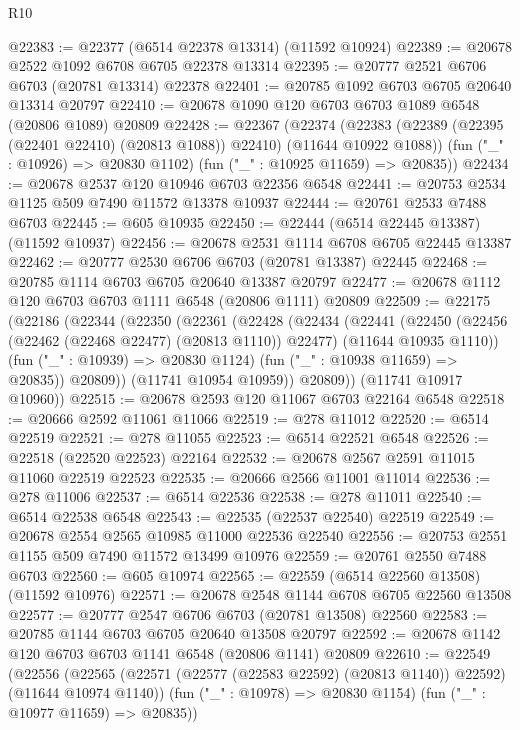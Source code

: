 \begin{lexlean}{R10}
\begin{coremodule}
@22383 := @22377 (@6514 @22378 @13314) (@11592 @10924)
@22389 := @20678 @2522 @1092 @6708 @6705 @22378 @13314
@22395 := @20777 @2521 @6706 @6703 (@20781 @13314) @22378
@22401 := @20785 @1092 @6703 @6705 @20640 @13314 @20797
@22410 := @20678 @1090 @120 @6703 @6703 @1089 @6548 (@20806 @1089) @20809
@22428 := @22367
    (@22374
      (@22383 (@22389 (@22395 (@22401 @22410) (@20813 @1088)) @22410) (@11644 @10922 @1088))
      (fun ("_" : @10926) => @20830 @1102)
      (fun ("_" : @10925 @11659) => @20835))
@22434 := @20678 @2537 @120 @10946 @6703 @22356 @6548
@22441 := @20753 @2534 @1125 @509 @7490 @11572 @13378 @10937
@22444 := @20761 @2533 @7488 @6703
@22445 := @605 @10935
@22450 := @22444 (@6514 @22445 @13387) (@11592 @10937)
@22456 := @20678 @2531 @1114 @6708 @6705 @22445 @13387
@22462 := @20777 @2530 @6706 @6703 (@20781 @13387) @22445
@22468 := @20785 @1114 @6703 @6705 @20640 @13387 @20797
@22477 := @20678 @1112 @120 @6703 @6703 @1111 @6548 (@20806 @1111) @20809
@22509 := @22175
    (@22186
      (@22344
        (@22350
          (@22361
            (@22428
              (@22434
                (@22441
                  (@22450
                    (@22456 (@22462 (@22468 @22477) (@20813 @1110)) @22477)
                    (@11644 @10935 @1110))
                  (fun ("_" : @10939) => @20830 @1124)
                  (fun ("_" : @10938 @11659) => @20835))
                @20809))
            (@11741 @10954 @10959))
          @20809))
      (@11741 @10917 @10960))
@22515 := @20678 @2593 @120 @11067 @6703 @22164 @6548
@22518 := @20666 @2592 @11061 @11066
@22519 := @278 @11012
@22520 := @6514 @22519
@22521 := @278 @11055
@22523 := @6514 @22521 @6548
@22526 := @22518 (@22520 @22523) @22164
@22532 := @20678 @2567 @2591 @11015 @11060 @22519 @22523
@22535 := @20666 @2566 @11001 @11014
@22536 := @278 @11006
@22537 := @6514 @22536
@22538 := @278 @11011
@22540 := @6514 @22538 @6548
@22543 := @22535 (@22537 @22540) @22519
@22549 := @20678 @2554 @2565 @10985 @11000 @22536 @22540
@22556 := @20753 @2551 @1155 @509 @7490 @11572 @13499 @10976
@22559 := @20761 @2550 @7488 @6703
@22560 := @605 @10974
@22565 := @22559 (@6514 @22560 @13508) (@11592 @10976)
@22571 := @20678 @2548 @1144 @6708 @6705 @22560 @13508
@22577 := @20777 @2547 @6706 @6703 (@20781 @13508) @22560
@22583 := @20785 @1144 @6703 @6705 @20640 @13508 @20797
@22592 := @20678 @1142 @120 @6703 @6703 @1141 @6548 (@20806 @1141) @20809
@22610 := @22549
    (@22556
      (@22565 (@22571 (@22577 (@22583 @22592) (@20813 @1140)) @22592) (@11644 @10974 @1140))
      (fun ("_" : @10978) => @20830 @1154)
      (fun ("_" : @10977 @11659) => @20835))

\end{coremodule}
\end{lexlean}
